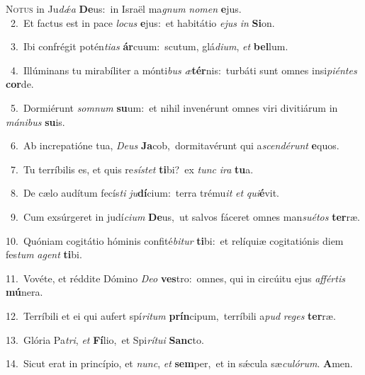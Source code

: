 \lettrine{\initial\textcolor{\initialcolor}{N}}{otus} in Ju\-\textit{dǽ}\-\textit{a} \textbf{De}\-us:~\star in Israël ma\textit{gnum} \textit{no}\-\textit{men} \textbf{e}\-jus.\\
{\numbfont\textcolor{\numbcolor}{~2.}}~Et factus est in pace \textit{lo}\-\textit{cus} \textbf{e}\-jus:~\star et habitátio \textit{e}\-\textit{jus} \textit{in} \textbf{Si}\-on.\par
{\numbfont\textcolor{\numbcolor}{~3.}}~Ibi confrégit potén\-\textit{ti}\-\textit{as} \textbf{ár}\-cuum:~\star scutum, glá\-\textit{di}\-\textit{um}, \textit{et} \textbf{bel}\-lum.\par
{\numbfont\textcolor{\numbcolor}{~4.}}~Illúminans tu mirabíliter a mónti\textit{bus} \textit{æ}\-\textbf{tér}nis:~\star turbáti sunt omnes insi\-\textit{pi}\-\textit{én}\textit{tes} \textbf{cor}\-de.\par
{\numbfont\textcolor{\numbcolor}{~5.}}~Dormiérunt \textit{som}\-\textit{num} \textbf{su}\-um:~\star et nihil invenérunt omnes viri divitiárum in \textit{má}\-\textit{ni}\textit{bus} \textbf{su}\-is.\par
{\numbfont\textcolor{\numbcolor}{~6.}}~Ab increpatióne tua, \textit{De}\-\textit{us} \textbf{Ja}\-cob,~\star dormitavérunt qui a\-\textit{scen}\-\textit{dé}\textit{runt} \textbf{e}\-quos.\par
{\numbfont\textcolor{\numbcolor}{~7.}}~Tu terríbilis es, et quis re\-\textit{sís}\-\textit{tet} \textbf{ti}\-bi?~\star ex \textit{tunc} \textit{i}\-\textit{ra} \textbf{tu}\-a.\par
{\numbfont\textcolor{\numbcolor}{~8.}}~De cælo audítum fecís\textit{ti} \textit{ju}\-\textbf{dí}cium:~\star terra trému\textit{it} \textit{et} \textit{qui}\-\textbf{é}vit.\par
{\numbfont\textcolor{\numbcolor}{~9.}}~Cum exsúrgeret in judí\-\textit{ci}\-\textit{um} \textbf{De}\-us,~\star ut salvos fáceret omnes man\-\textit{su}\-\textit{é}\textit{tos} \textbf{ter}\-ræ.\par
{\numbfont\textcolor{\numbcolor}{10.}}~Quóniam cogitátio hóminis confité\-\textit{bi}\-\textit{tur} \textbf{ti}\-bi:~\star et relíquiæ cogitatiónis diem fes\textit{tum} \textit{a}\-\textit{gent} \textbf{ti}\-bi.\par
{\numbfont\textcolor{\numbcolor}{11.}}~Vovéte, et réddite Dómino \textit{De}\-\textit{o} \textbf{ves}\-tro:~\star omnes, qui in circúitu ejus \textit{af}\-\textit{fér}\textit{tis} \textbf{mú}\-nera.\par
{\numbfont\textcolor{\numbcolor}{12.}}~Terríbili et ei qui aufert spí\-\textit{ri}\-\textit{tum} \textbf{prín}\-cipum,~\star terríbili a\textit{pud} \textit{re}\-\textit{ges} \textbf{ter}\-ræ.\par
{\numbfont\textcolor{\numbcolor}{13.}}~Glória Pa\-\textit{tri}\-, \textit{et} \textbf{Fí}\-lio,~\star et Spi\-\textit{rí}\-\textit{tu}\textit{i} \textbf{Sanc}\-to.\par
{\numbfont\textcolor{\numbcolor}{14.}}~Sicut erat in princípio, et \textit{nunc}\-, \textit{et} \textbf{sem}\-per,~\star et in sǽcula sæ\-\textit{cu}\-\textit{ló}\textit{rum}. \textbf{A}\-men.\par

